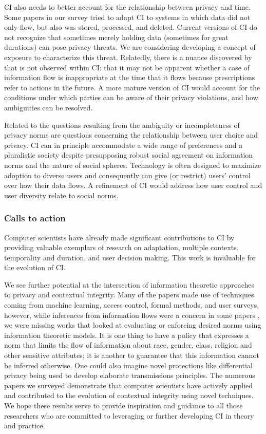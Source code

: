 \documentclass[../thesis.tex]{subfiles}
\begin{document}
CI also needs to better account for the relationship between privacy and
time. Some papers in our survey tried to adapt CI to systems in which
data did not only flow, but also was stored, processed, and
deleted.
Current versions of CI do not
recognize that sometimes merely holding data (sometimes for great
durations) can pose privacy threats. We are considering developing a
concept of exposure to characterize this threat. Relatedly, there is a
nuance discovered by \citet{datta2011understanding} that is not observed within
CI: that it may not be apparent whether a case of information flow is
inappropriate at the time that it flows because prescriptions refer to
actions in the future. A more mature version of CI would account for
the conditions under which parties can be aware of their privacy
violations, and how ambiguities can be resolved.

Related to the questions resulting from the ambiguity or incompleteness
of privacy norms are questions concerning the relationship between user
choice and privacy. CI can in principle accommodate a wide range of
preferences and a pluralistic society despite presupposing robust
social agreement on information norms and the nature of social spheres.
Technology is often designed to maximize adoption to diverse users and
consequently can give (or restrict) users' control over
how their data flows. A refinement of CI would address how user control
and user diversity relate to social norms.

\subsubsection{Calls to action}
\label{CI5.4.2}

Computer scientists have already made significant contributions to CI by
providing valuable exemplars of research on adaptation, multiple
contexts, temporality and duration, and user decision making. This work
is invaluable for the evolution of CI.

We see further potential at the intersection of information theoretic
approaches to privacy and contextual integrity. Many of the papers made
use of techniques coming from machine learning, access control, formal
methods, and user surveys, however, while inferences from information
flows were a concern in some papers \cite{omoronyia2012caprice}
\cite{omoronyia2013engineering} \cite{datta2011understanding},
we were missing works that looked at
evaluating or enforcing desired norms using information theoretic
models. It is one thing to have a policy that expresses a norm
that limits
the flow of information about race, gender, class, religion and other
sensitive attributes; it is another to guarantee that this information
cannot be inferred otherwise. One could also imagine novel protections
like differential privacy being used to develop elaborate transmissions
principles. The numerous papers we surveyed demonstrate that computer
scientists have actively applied and contributed to the evolution of
contextual integrity using novel techniques. We hope these results
serve to provide inspiration and guidance to all those researchers who
are committed to leveraging or further developing CI in theory and
practice.
 
\end{document}
